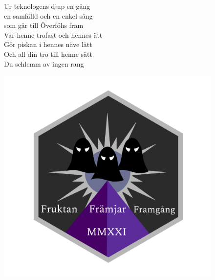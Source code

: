 \documentclass[a6paper,10pt]{article}
\begin{document}
\setlength{\oddsidemargin}{-0.47in}
\noindent
\begin{center}
\end{center}
\vspace{-15pt}
\begin{figure}[!h]
\begin{minipage}{0.6\linewidth}
\begin{lyrics}
\small Ur teknologens djup en gång\\
en samfälld och en enkel sång\\
som går till Överföhs fram
\vspace{5pt}\\
Var henne trofast och hennes ätt\\
Gör piskan i hennes näve lätt\\
Och all din tro till henne sätt\\
Du schlemm av ingen rang
\end{lyrics}
\end{minipage}
\begin{minipage}{0.38\linewidth}
\includegraphics[width=\textwidth]{loggan.png}
\end{minipage}
\end{figure}
\vspace{-10pt}
\vspace{10pt}
\end{document}
